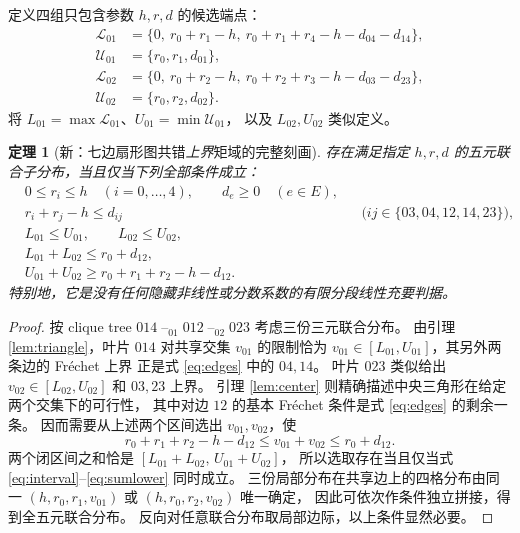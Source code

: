 \documentclass[11pt,a4paper]{ctexart}
\newtheorem{theorem}{定理}[section]
\theoremstyle{remark}\newtheorem{remark}[theorem]{说明}
\begin{document}
定义四组只包含参数 $h,r,d$ 的候选端点：
\begin{equation}\label{eq:LU}
\begin{aligned}
\mathcal L_{01}&=\{0,\ r_0+r_1-h,\ r_0+r_1+r_4-h-d_{04}-d_{14}\},\\
\mathcal U_{01}&=\{r_0,r_1,d_{01}\},\\
\mathcal L_{02}&=\{0,\ r_0+r_2-h,\ r_0+r_2+r_3-h-d_{03}-d_{23}\},\\
\mathcal U_{02}&=\{r_0,r_2,d_{02}\}.
\end{aligned}
\end{equation}
将 $L_{01}=\max\mathcal L_{01}$、$U_{01}=\min\mathcal U_{01}$，
以及 $L_{02},U_{02}$ 类似定义。

\begin{theorem}[新：七边扇形图共错\emph{上界}矩域的完整刻画]\label{thm:moments}
存在满足指定 $h,r,d$ 的五元联合子分布，当且仅当下列\emph{全部}条件成立：
\begin{align}
&0\le r_i\le h\quad(i=0,\ldots,4),\qquad d_e\ge0\quad(e\in E),\label{eq:base}\\
&r_i+r_j-h\le d_{ij}
&&\bigl(ij\in\{03,04,12,14,23\}\bigr),\label{eq:edges}\\
&L_{01}\le U_{01},\qquad L_{02}\le U_{02},\label{eq:interval}\\
&L_{01}+L_{02}\le r_0+d_{12},\label{eq:sumupper}\\
&U_{01}+U_{02}\ge r_0+r_1+r_2-h-d_{12}.\label{eq:sumlower}
\end{align}
特别地，它是没有任何隐藏非线性或分数系数的\emph{有限分段线性充要判据}。
\end{theorem}
\begin{proof}
按 clique tree
$014\;\text{--}_{01}\;012\;\text{--}_{02}\;023$
考虑三份三元联合分布。
由引理 \ref{lem:triangle}，叶片 $014$ 对共享交集 $v_{01}$ 的限制恰为
$v_{01}\in[L_{01},U_{01}]$，其另外两条边的 Fr\'echet 上界
正是式 \eqref{eq:edges} 中的 $04,14$。
叶片 $023$ 类似给出 $v_{02}\in[L_{02},U_{02}]$ 和 $03,23$ 上界。
引理 \ref{lem:center} 则精确描述中央三角形在给定两个交集下的可行性，
其中对边 $12$ 的基本 Fr\'echet 条件是式 \eqref{eq:edges} 的剩余一条。
因而需要从上述两个区间选出 $v_{01},v_{02}$，使
\[
r_0+r_1+r_2-h-d_{12}\le v_{01}+v_{02}\le r_0+d_{12}.
\]
两个闭区间之和恰是
$[L_{01}+L_{02},\,U_{01}+U_{02}]$，
所以选取存在当且仅当式 \eqref{eq:interval}--\eqref{eq:sumlower} 同时成立。
三份局部分布在共享边上的四格分布由同一
$(h,r_0,r_1,v_{01})$ 或 $(h,r_0,r_2,v_{02})$ 唯一确定，
因此可依次作条件独立拼接，得到全五元联合分布。
反向对任意联合分布取局部边际，以上条件显然必要。
\end{proof}
\end{document}
